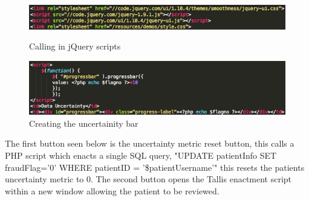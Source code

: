 \documentclass[11pt]{article}
\begin{document}
\begin{figure}[h!] 
\includegraphics[width=\linewidth]{buttonscripts.png}
\caption{Calling in jQuery scripts \label{buttonscripts}}
\endminipage\hfill
{}
\includegraphics[width=\linewidth]{progressbar.png}
\caption{Creating the uncertainity bar \label{progressbar}}
\endminipage
\end{figure} 
The first button seen below is the uncertainty metric reset button, this calls a PHP script which enacts a single SQL query, "UPDATE patientInfo SET fraudFlag='0' WHERE patientID = '\$patientUsername'" this resets the patients uncertainty metric to 0. The second button opens the Tallis enactment script within a new window allowing the patient to be reviewed.
\end{document}
